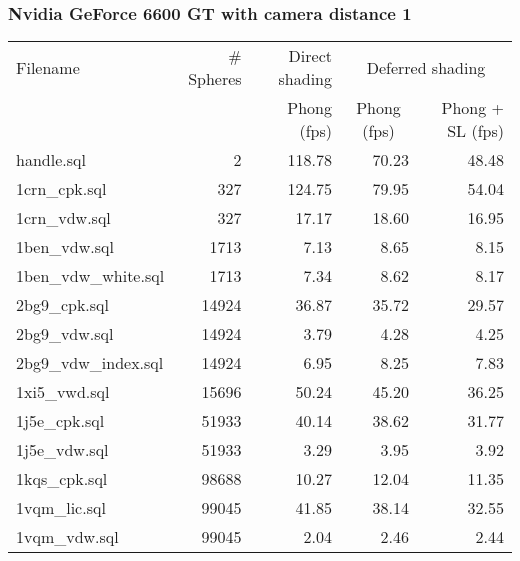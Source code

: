 \subsubsection*{Nvidia GeForce 6600 GT with camera distance 1}
\begin{tabular}{|l|r|r|r|r|}
\hline
Filename & \# Spheres & Direct shading & \multicolumn{2}{|c|}{Deferred shading} \\
         &            & Phong (fps)    & \multicolumn{1}{|c}{Phong (fps)} & Phong + SL (fps) \\  
\hline
\hline
handle.sql & 2 & 118.78 & 70.23 & 48.48 \\
\hline
1crn\_cpk.sql & 327 & 124.75 & 79.95 & 54.04 \\
\hline
1crn\_vdw.sql & 327 & 17.17 & 18.60 & 16.95 \\
\hline
1ben\_vdw.sql & 1713 & 7.13 & 8.65 & 8.15 \\
\hline
1ben\_vdw\_white.sql & 1713 & 7.34 & 8.62 & 8.17 \\
\hline
2bg9\_cpk.sql & 14924 & 36.87 & 35.72 & 29.57 \\
\hline
2bg9\_vdw.sql & 14924 & 3.79 & 4.28 & 4.25 \\
\hline
2bg9\_vdw\_index.sql & 14924 & 6.95 & 8.25 & 7.83 \\
\hline
1xi5\_vwd.sql & 15696 & 50.24 & 45.20 & 36.25 \\
\hline
1j5e\_cpk.sql & 51933 & 40.14 & 38.62 & 31.77 \\
\hline
1j5e\_vdw.sql & 51933 & 3.29 & 3.95 & 3.92 \\
\hline
1kqs\_cpk.sql & 98688 & 10.27 & 12.04 & 11.35 \\
\hline
1vqm\_lic.sql & 99045 & 41.85 & 38.14 & 32.55 \\
\hline
1vqm\_vdw.sql & 99045 & 2.04 & 2.46 & 2.44 \\
\hline
\end{tabular}
